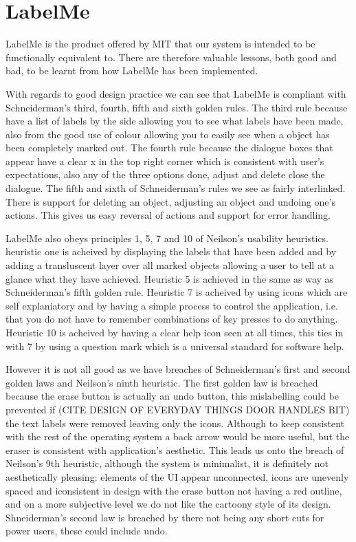 \documentclass[a4paper,11pt,oneside]{article}
\begin{document}
\section{LabelMe}
LabelMe is the product offered by MIT that our system is intended to be functionally equivalent to.  There are therefore valuable lessons, both good and bad, to be learnt from how LabelMe has been implemented.

With regards to good design practice we can see that LabelMe is compliant with Schneiderman's third, fourth, fifth and sixth golden rules.  The third rule because have a list of labels by the side allowing you to see what labels have been made, also from the good use of colour allowing you to easily see when a object has been completely marked out.  The fourth rule because the dialogue boxes that appear have a clear x in the top right corner which is consistent with user's expectations, also any of the three options done, adjust and delete close the dialogue.  The fifth and sixth of Schneiderman's rules we see as fairly interlinked.  There is support for deleting an object, adjusting an object and undoing one's actions.  This gives us easy reversal of actions and support for error handling.

LabelMe also obeys principles 1, 5, 7 and 10 of Neilson's usability heuristics. 
heuristic one is acheived by displaying the labels that have been added and by
adding a transluscent layer over all marked objects allowing a user to tell at a
glance what they have achieved.  Heuristic 5 is achieved in the same as way as
Schneiderman's fifth golden rule.  Heuristic 7 is acheived by using icons which
are self explaniatory and by having a simple process to control the application,
 i.e. that you do not have to remember combinations of key presses to do
anything. Heuristic 10 is acheived by having a clear help icon seen at all
times, this ties in with 7 by using a question mark which is a universal
standard for software help.

However it is not all good as we have breaches of Schneiderman's first and second golden laws and Neilson's ninth heuristic.  The first golden law is breached because the erase button is actually an undo button, this mislabelling could be prevented if (CITE DESIGN OF EVERYDAY THINGS DOOR HANDLES BIT) the text labels were removed leaving only the icons.  Although to keep consistent with the rest of the operating system a back arrow would be more useful, but the eraser is consistent with application's aesthetic.  This leads us onto the breach of Neilson's 9th heuristic, although the system is minimalist, it is definitely not aesthetically pleasing: elements of the UI appear unconnected, icons are unevenly spaced and iconsistent in design with the erase button not having a red outline, and on a more subjective level we do not like the cartoony style of its design.  Shneiderman's second law is breached by there not being any short cuts for power users, these could include undo.
\end{document}
